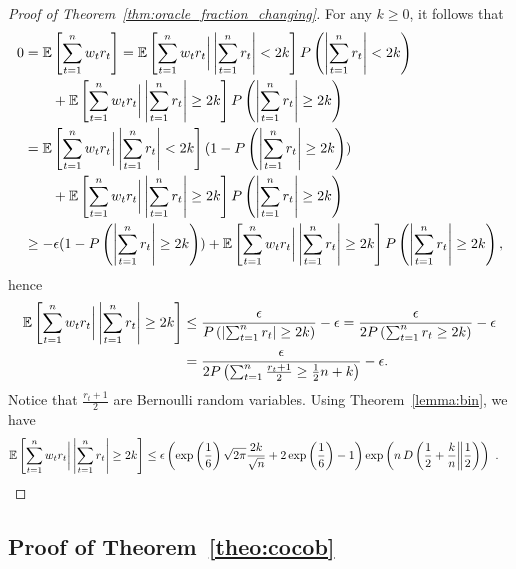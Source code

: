 \begin{proof}[Proof of Theorem~\ref{thm:oracle_fraction_changing}]
For any $k\geq 0$, it follows that
\begin{align*}
0&=\mathbb{E}\left[\sum_{t=1}^n w_t r_t \right] 
= \mathbb{E}\left[\sum_{t=1}^n w_t r_t \bigg| \left|\sum_{t=1}^n r_t \right|< 2 k\right] P\left(\left|\sum_{t=1}^n r_t\right|< 2k \right)\\
&\qquad+\mathbb{E}\left[\sum_{t=1}^n w_t r_t \bigg| \left|\sum_{t=1}^n r_t \right| \geq 2 k\right] P\left(\left|\sum_{t=1}^n r_t\right|\geq 2 k\right) \\
&=\mathbb{E}\left[\sum_{t=1}^n w_t r_t \bigg| \left|\sum_{t=1}^n r_t \right|< 2 k\right] (1-P\left(\left|\sum_{t=1}^n r_t\right|\geq 2 k\right))\\
&\qquad+\mathbb{E}\left[\sum_{t=1}^n w_t r_t \bigg| \left|\sum_{t=1}^n r_t \right| \geq 2 k\right] P\left(\left|\sum_{t=1}^n r_t\right|\geq 2 k\right) \\
&\geq -\epsilon (1-P\left(\left|\sum_{t=1}^n r_t\right|\geq 2 k\right))+\mathbb{E}\left[\sum_{t=1}^n w_t r_t \bigg| \left|\sum_{t=1}^n r_t\right| \geq 2 k\right] P\left(\left|\sum_{t=1}^n r_t \right|\geq 2 k\right),
\end{align*}
hence
\begin{align*}
\mathbb{E}\left[\sum_{t=1}^n w_t r_t \bigg| \left|\sum_{t=1}^n r_t\right| \geq 2 k\right]
&\leq \frac{\epsilon}{P\left(\left|\sum_{t=1}^n r_t\right|\geq 2 k\right)} -\epsilon
= \frac{\epsilon}{2 P\left(\sum_{t=1}^n r_t \geq 2 k\right)} -\epsilon\\
&= \frac{\epsilon}{2 P\left(\sum_{t=1}^n \frac{r_t + 1}{2} \geq \frac{1}{2}n+ k \right)}-\epsilon.
\end{align*}
Notice that $\frac{r_t + 1}{2}$ are Bernoulli random variables.
Using Theorem~\ref{lemma:bin}, we have
\begin{align*}
\mathbb{E}\left[\sum_{t=1}^n w_t r_t \bigg| \left|\sum_{t=1}^n r_t\right| \geq 2 k\right]
&\leq \epsilon \left(\exp\left(\frac{1}{6}\right)\sqrt{2 \pi}\frac{2k}{\sqrt{n}} +2\exp\left(\frac{1}{6}\right)-1\right)\exp\left(n \, D\left(\frac{1}{2}+\frac{k}{n}\middle\|\frac{1}{2}\right)\right)~. \qedhere
\end{align*}
\end{proof}

\subsection{Proof of Theorem~\ref{theo:cocob}}

